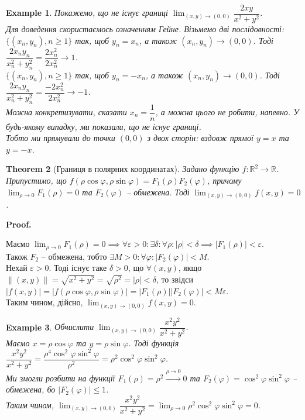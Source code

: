 \documentclass[a4paper, 10pt]{article}
\makeatletter
\def\huge{\displaystyle}
\def\qed{$\blacksquare$}
\theoremstyle{theoremdd}
\newtheorem{theorem}{Theorem}[subsection]
\theoremstyle{theoremdd}
\theoremstyle{theoremdd}
\theoremstyle{theoremdd}
\theoremstyle{theoremdd}
\newtheorem{example}[theorem]{Example}
\theoremstyle{theoremdd}
\theoremstyle{theoremdd}
\theoremstyle{theoremdd}
\theoremstyle{theoremdd}
\renewenvironment{proof}[1][Proof.\\]{\par
\pushQED{\hfill \qed}%
\normalfont \topsep6\p@\@plus6\p@\relax
\trivlist
\item\relax
{\bfseries
#1\@addpunct{.}}\hspace\labelsep\ignorespaces
}{%
\popQED\endtrivlist\@endpefalse
}
\newcommand\Norm[1]{\|#1\|}
\makeatother
\begin{document}
\begin{example}
Покажемо, що не існує границі $\displaystyle\lim_{(x,y) \to (0,0)} \dfrac{2xy}{x^2+y^2}$.\\
Для доведення скористаємось означенням Гейне. Візьмемо дві послідовності:\\
$\{(x_n,y_n), n \geq 1\}$ так, щоб $y_n = x_n$, а також $(x_n,y_n) \to (0,0)$. Тоді $\dfrac{2x_n y_n}{x_n^2+y_n^2} = \dfrac{2x_n^2}{2x_n^2} \to 1$.\\
$\{(x_n,y_n), n \geq 1\}$ так, щоб $y_n = -x_n$, а також $(x_n,y_n) \to (0,0)$. Тоді $\dfrac{2x_n y_n}{x_n^2+y_n^2} = \dfrac{-2x_n^2}{2x_n^2} \to -1$.\\
Можна конкретизувати, сказати $x_n = \dfrac{1}{n}$, а можна цього не робити, напевно. У будь-якому випадку, ми показали, що не існує границі.\\
Тобто ми прямували до точки $(0,0)$ з двох сторін: вздовж прямої $y = x$ та $y = -x$.
\end{example}

\begin{theorem}[Границя в полярних координатах]
Задано функцію $f \colon \mathbb{R}^2 \to \mathbb{R}$. Припустимо, що $f(\rho \cos \varphi, \rho \sin \varphi) = F_1(\rho) F_2(\varphi)$, причому $\huge\lim_{\rho \to 0} F_1(\rho) = 0$ та $F_2(\varphi)$ -- обмежена. Тоді $\huge\lim_{(x,y) \to (0,0)} f(x,y) = 0$.
\end{theorem}

\begin{proof}
Маємо $\huge\lim_{\rho \to 0} F_1(\rho) = 0 \implies \forall \varepsilon > 0: \exists \delta: \forall \rho: |\rho| < \delta \implies |F_1(\rho)| < \varepsilon$.\\
Також $F_2$ -- обмежена, тобто $\exists M>0: \forall \varphi: |F_2(\varphi)| < M$.\\
Нехай $\varepsilon > 0$. Тоді існує таке $\delta > 0$, що $\forall (x,y)$, якщо $\Norm{(x,y)} = \sqrt{x^2+y^2} = \sqrt{\rho^2} = |\rho| < \delta$, то звідси $|f(x,y)| = |f(\rho \cos \varphi, \rho \sin \varphi)| = |F_1(\rho)| |F_2(\varphi)| < M\varepsilon$.\\
Таким чином, дійсно, $\huge\lim_{(x,y) \to (0,0)} f(x,y) = 0$.
\end{proof}

\begin{example}
Обчислити $\huge\lim_{(x,y) \to (0,0)} \dfrac{x^2y^2}{x^2+y^2}$.\\
Маємо $x = \rho \cos \varphi$ та $y = \rho \sin \varphi$. Тоді функція $\dfrac{x^2y^2}{x^2+y^2} = \dfrac{\rho^4 \cos^2 \varphi \sin^2 \varphi}{\rho^2} = \rho^2 \cos^2 \varphi \sin^2 \varphi$.\\
Ми змогли розбити на функції $F_1(\rho) = \rho^2 \overset{\rho \to 0}{\longrightarrow} 0$ та $F_2(\varphi) = \cos^2 \varphi \sin^2 \varphi$ -- обмежена, бо $|F_2(\varphi)| \leq 1$.\\
Таким чином, $\huge\lim_{(x,y) \to (0,0)} \dfrac{x^2y^2}{x^2+y^2} = \lim_{\rho \to 0} \rho^2 \cos^2 \varphi \sin^2 \varphi = 0$.
\end{example}
\end{document}
